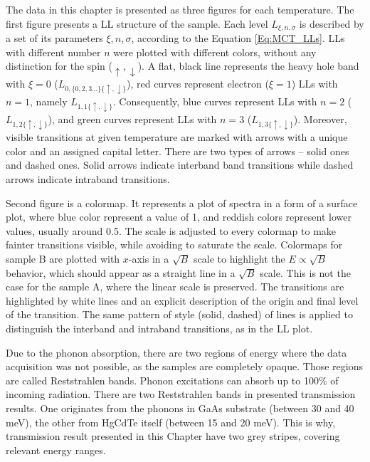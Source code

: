 \documentclass[titlepage,a4paper]{book}
\begin{document}
The data in this chapter is presented as three figures for each temperature. The first figure presents a LL structure of the sample. Each level $L_{\xi,n,\sigma}$ is described by a set of its parameters $\xi,n,\sigma$, according to the Equation \ref{Eq:MCT_LLs}. LLs with different number $n$ were plotted with different colors, without any distinction for the spin ($\uparrow,\downarrow$). A flat, black line represents the heavy hole band with $\xi = 0$ ($L_{0,\{0,2,3...\}\{\uparrow,\downarrow\}}$), red curves represent electron ($\xi = 1$) LLs with $n = 1$, namely $L_{1,1\{\uparrow,\downarrow\}}$. Consequently, blue curves represent LLs with $n = 2$ ($L_{1,2\{\uparrow,\downarrow\}}$), and green curves represent LLs with $n = 3$ ($L_{1,3\{\uparrow,\downarrow\}}$). Moreover, visible transitions at given temperature are marked with arrows with a unique color and an assigned capital letter. There are two types of arrows -- solid ones and dashed ones. Solid arrows indicate interband band transitions while dashed arrows indicate intraband transitions. 

Second figure is a colormap. It represents a plot of spectra in a form of a surface plot, where blue color represent a value of 1, and reddish colors represent lower values, usually around 0.5. The scale is adjusted to every colormap to make fainter transitions visible, while avoiding to saturate the scale. Colormaps for sample B are plotted with $x$-axis in a $\sqrt{B}$ scale to highlight the $E \propto \sqrt{B}$ behavior, which should appear as a straight line in a $\sqrt{B}$ scale. This is not the case for the sample A, where the linear scale is preserved. The transitions are highlighted by white lines and an explicit description of the origin and final level of the transition. The same pattern of style (solid, dashed) of lines is applied to distinguish the interband and intraband transitions, as in the LL plot. 

Due to the phonon absorption, there are two regions of energy where the data acquisition was not possible, as the samples are completely opaque. Those regions are called Reststrahlen bands. Phonon excitations can absorb up to 100\% of incoming radiation. There are two Reststrahlen bands in presented transmission results. One originates from the phonons in GaAs substrate (between 30 and 40 meV), the other from HgCdTe itself (between 15 and 20 meV). This is why, transmission result presented in this Chapter have two grey stripes, covering relevant energy ranges. 

\end{document}
